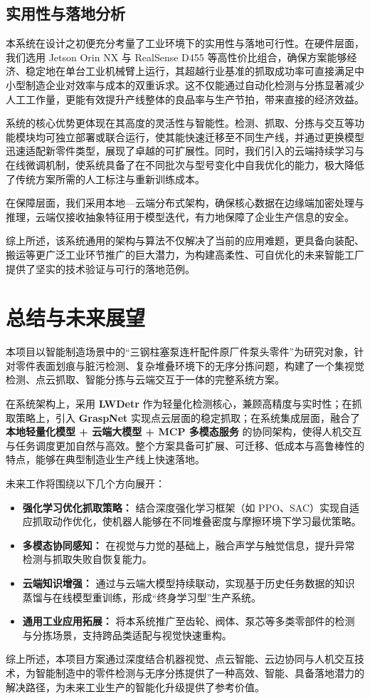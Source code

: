 \documentclass{cumcmthesis}
\begin{document}
\subsection{实用性与落地分析}

本系统在设计之初便充分考量了工业环境下的实用性与落地可行性。在硬件层面，我们选用 Jetson Orin NX 与 RealSense D455 等高性价比组合，确保方案能够经济、稳定地在单台工业机械臂上运行，其超越行业基准的抓取成功率可直接满足中小型制造企业对效率与成本的双重诉求。这不仅能通过自动化检测与分拣显著减少人工工作量，更能有效提升产线整体的良品率与生产节拍，带来直接的经济效益。

系统的核心优势更体现在其高度的灵活性与智能性。检测、抓取、分拣与交互等功能模块均可独立部署或联合运行，使其能快速迁移至不同生产线，并通过更换模型迅速适配新零件类型，展现了卓越的可扩展性。同时，我们引入的云端持续学习与在线微调机制，使系统具备了在不同批次与型号变化中自我优化的能力，极大降低了传统方案所需的人工标注与重新训练成本。

在保障层面，我们采用本地—云端分布式架构，确保核心数据在边缘端加密处理与推理，云端仅接收抽象特征用于模型迭代，有力地保障了企业生产信息的安全。

综上所述，该系统通用的架构与算法不仅解决了当前的应用难题，更具备向装配、搬运等更广泛工业环节推广的巨大潜力，为构建高柔性、可自优化的未来智能工厂提供了坚实的技术验证与可行的落地范例。


\section{总结与未来展望}

本项目以智能制造场景中的“三钢柱塞泵连杆配件原厂件泵头零件”为研究对象，针对零件表面划痕与脏污检测、复杂堆叠环境下的无序分拣问题，构建了一个集视觉检测、点云抓取、智能分拣与云端交互于一体的完整系统方案。

在系统架构上，采用 \textbf{LWDetr} 作为轻量化检测核心，兼顾高精度与实时性；在抓取策略上，引入 \textbf{GraspNet} 实现点云层面的稳定抓取；在系统集成层面，融合了 \textbf{本地轻量化模型 + 云端大模型 + MCP 多模态服务} 的协同架构，使得人机交互与任务调度更加自然与高效。整个方案具备可扩展、可迁移、低成本与高鲁棒性的特点，能够在典型制造业生产线上快速落地。

未来工作将围绕以下几个方向展开：

\begin{itemize}
    \item \textbf{强化学习优化抓取策略：} 结合深度强化学习框架（如 PPO、SAC）实现自适应抓取动作优化，使机器人能够在不同堆叠密度与摩擦环境下学习最优策略。
    \item \textbf{多模态协同感知：} 在视觉与力觉的基础上，融合声学与触觉信息，提升异常检测与抓取失败自恢复能力。
    \item \textbf{云端知识增强：} 通过与云端大模型持续联动，实现基于历史任务数据的知识蒸馏与在线模型重训练，形成“终身学习型”生产系统。
    \item \textbf{通用工业应用拓展：} 将本系统推广至齿轮、阀体、泵芯等多类零部件的检测与分拣场景，支持跨品类适配与视觉快速重构。
\end{itemize}

综上所述，本项目方案通过深度结合机器视觉、点云智能、云边协同与人机交互技术，为智能制造中的零件检测与无序分拣提供了一种高效、智能、具备落地潜力的解决路径，为未来工业生产的智能化升级提供了参考价值。
\newpage

\end{document}
